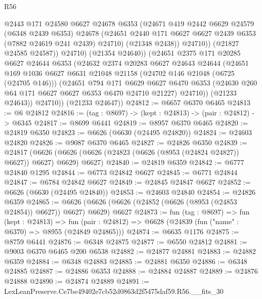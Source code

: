 \begin{lexlean}{R56}
\begin{coremodule}
                  @2443
                  @171
                  @24580
                  @6627
                  @24678
                  @6353
                  (@24671
                    @419
                    @2442
                    @6629
                    @24579
                    (@6348 @2439 @6353)
                    @24678
                    (@24651 @2440 @171 @6627 @6627 @2439 @6353 (@7882 @24619 @241 @2439) @24710)
                    (@21348 @2438))
                  @24710))
              (@21827 @24585 @24587))
            @24710)
          (@21354 @24640))
        (@24651
          @2375
          @171
          @20285
          @6627
          @24644
          @6353
          (@24632
            @2374
            @20283
            @6627
            @24643
            @24644
            (@24651
              @169
              @1036
              @6627
              @6631
              @21048
              @21158
              (@24702 @146 @21048 (@6725 (@24705 @146)))
              (@24651
                @794
                @171
                @6629
                @6627
                @6470
                @6353
                (@24630 @260 @64 @171 @6627 @6627 @6353 @6470 @24710 @21227)
                @24710))
            (@21233 @24643))
          @24710))
      (@21233 @24647))
@24812 := @6657 @6370 @6465
@24813 := @6 @24812
@24816 := (tag : @8697) -> (kept : @24813) -> (pair : @24812) -> @6345
@24817 := @8699 @6441
@24819 := @8957 @6370 @6465
@24820 := @24819 @6350
@24823 := @6626 (@6630 (@24495 @24820))
@24824 := @24603 @24820
@24826 := @9087 @6370 @6465
@24827 := @24826 @6350
@24839 := @24817
    (@6626 (@6626 (@6626 (@24823 (@6626 (@8953 (@24824 @24827)) @6627)) @6627) @6629) @6627)
@24840 := @24819 @6359
@24842 := @6777 @24840 @1295
@24844 := @6773 @24842 @6627
@24845 := @6771 @24844
@24847 := @6784 @24842 @6627
@24849 := @24845 @24847 @6627
@24852 := @6626 (@6630 (@24495 @24840))
@24853 := @24603 @24840
@24854 := @24826 @6359
@24865 := @6626 (@6626 (@6626 (@24852 (@6626 (@8953 (@24853 @24854)) @6627)) @6627) @6629) @6627
@24873 := fun (tag : @8697) =>
  fun (kept : @24813) =>
  fun (pair : @24812) => @6628 (@24839 (fun ("name" : @6370) => @8955 (@24849 @24865)))
@24874 := @6635 @1176
@24875 := @8759 @6441
@24876 := @6348 @24875
@24877 := @6550 @24812
@24881 := @9003 @6370 @6465 @200 @6538
@24882 := @24877 @24881
@24883 := @24882 @6359
@24884 := @6348 @24883
@24885 := @24881 @6350
@24886 := @6348 @24885
@24887 := @24886 @6353
@24888 := @24884 @24887
@24889 := @24876 @24888
@24890 := @24874 @24889
@24891 := LexLeanPreserve.Ce7be49402e7cb52d0863d2f5475daf59.R56.__fits_30

\end{coremodule}
\end{lexlean}
